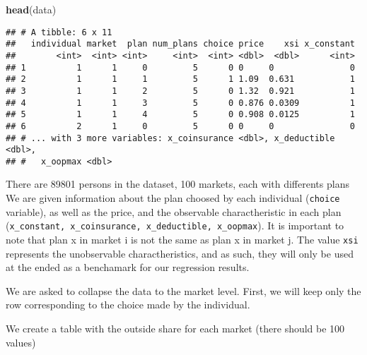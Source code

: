 \documentclass[]{article}
\newenvironment{Shaded}{\begin{snugshade}}{\end{snugshade}}
\newcommand{\DataTypeTok}[1]{\textcolor[rgb]{0.13,0.29,0.53}{#1}}
\newcommand{\DecValTok}[1]{\textcolor[rgb]{0.00,0.00,0.81}{#1}}
\newcommand{\KeywordTok}[1]{\textcolor[rgb]{0.13,0.29,0.53}{\textbf{#1}}}
\newcommand{\NormalTok}[1]{#1}
\newcommand{\OperatorTok}[1]{\textcolor[rgb]{0.81,0.36,0.00}{\textbf{#1}}}
\newcommand{\StringTok}[1]{\textcolor[rgb]{0.31,0.60,0.02}{#1}}
\begin{document}
\begin{Shaded}
\begin{Highlighting}[]
\KeywordTok{head}\NormalTok{(data)}
\end{Highlighting}
\end{Shaded}

\begin{verbatim}
## # A tibble: 6 x 11
##   individual market  plan num_plans choice price    xsi x_constant
##        <int>  <int> <int>     <int>  <int> <dbl>  <dbl>      <int>
## 1          1      1     0         5      0 0     0               0
## 2          1      1     1         5      1 1.09  0.631           1
## 3          1      1     2         5      0 1.32  0.921           1
## 4          1      1     3         5      0 0.876 0.0309          1
## 5          1      1     4         5      0 0.908 0.0125          1
## 6          2      1     0         5      0 0     0               0
## # ... with 3 more variables: x_coinsurance <dbl>, x_deductible <dbl>,
## #   x_oopmax <dbl>
\end{verbatim}

There are 89801 persons in the dataset, 100 markets, each with
differents plans We are given information about the plan choosed by each
individual (\texttt{choice} variable), as well as the price, and the
observable charactheristic in each plan
(\texttt{x\_constant,\ x\_coinsurance,\ x\_deductible,\ x\_oopmax}). It
is important to note that plan x in market i is not the same as plan x
in market j. The value \texttt{xsi} represents the unobservable
charactheristics, and as such, they will only be used at the ended as a
benchamark for our regression results.

We are asked to collapse the data to the market level. First, we will
keep only the row corresponding to the choice made by the individual.

We create a table with the outside share for each market (there should
be 100 values)

\begin{Shaded}
\end{Shaded}
\end{document}
